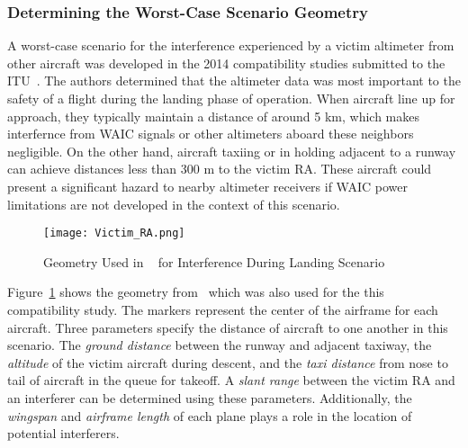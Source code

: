 \subsubsection{Determining the Worst-Case Scenario Geometry}
A worst-case scenario for the interference experienced by a victim altimeter from other aircraft was developed in the 2014 compatibility studies submitted to the ITU~\cite{noauthor_compatibility_2014}. The authors determined that the altimeter data was most important to the safety of a flight during the landing phase of operation. When aircraft line up for approach, they typically maintain a distance of around 5 km, which makes interfernce from WAIC signals or other altimeters aboard these neighbors negligible. On the other hand, aircraft taxiing or in holding adjacent to a runway can achieve distances less than 300 m to the victim RA. These aircraft could present a significant hazard to nearby altimeter receivers if WAIC power limitations are not developed in the context of this scenario. 

\begin{figure}[ht]
\centering
\texttt{[image: Victim\_RA.png]}
\caption{Geometry Used in ~\cite{noauthor_compatibility_2014} for Interference During Landing Scenario}

\label{fig:victim_ra}

\end{figure}

Figure~\ref{fig:victim_ra} shows the geometry from~\cite{noauthor_compatibility_2014} which was also used for the this compatibility study. The markers represent the center of the airframe for each aircraft. Three parameters specify the distance of aircraft to one another in this scenario. The \textit{ground distance} between the runway and adjacent taxiway, the \textit{altitude} of the victim aircraft during descent, and the \textit{taxi distance} from nose to tail of aircraft in the queue for takeoff. A \textit{slant range} between the victim RA and an interferer can be determined using these parameters. Additionally, the \textit{wingspan} and \textit{airframe length} of each plane plays a role in the location of potential interferers.

